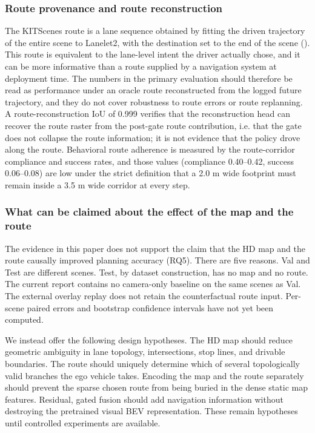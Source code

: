 \documentclass[
  english,
  10pt,
]{article}
\begin{document}
\subsubsection{Route provenance and route
reconstruction}\label{route-provenance-and-route-reconstruction}

The KITScenes route is a lane sequence obtained by fitting the driven
trajectory of the entire scene to Lanelet2, with the destination set to
the end of the scene (\hyperref[fig-route]{}). This route is equivalent
to the lane-level intent the driver actually chose, and it can be more
informative than a route supplied by a navigation system at deployment
time. The numbers in the primary evaluation should therefore be read as
performance under an oracle route reconstructed from the logged future
trajectory, and they do not cover robustness to route errors or route
replanning. A route-reconstruction IoU of 0.999 verifies that the
reconstruction head can recover the route raster from the post-gate
route contribution, i.e. that the gate does not collapse the route
information; it is not evidence that the policy drove along the route.
Behavioral route adherence is measured by the route-corridor compliance
and success rates, and those values (compliance 0.40--0.42, success
0.06--0.08) are low under the strict definition that a 2.0 m wide
footprint must remain inside a 3.5 m wide corridor at every step.

\subsubsection{What can be claimed about the effect of the map and the
route}\label{what-can-be-claimed-about-the-effect-of-the-map-and-the-route}

The evidence in this paper does not support the claim that the HD map
and the route causally improved planning accuracy (RQ5). There are five
reasons. Val and Test are different scenes. Test, by dataset
construction, has no map and no route. The current report contains no
camera-only baseline on the same scenes as Val. The external overlay
replay does not retain the counterfactual route input. Per-scene paired
errors and bootstrap confidence intervals have not yet been computed.

We instead offer the following design hypotheses. The HD map should
reduce geometric ambiguity in lane topology, intersections, stop lines,
and drivable boundaries. The route should uniquely determine which of
several topologically valid branches the ego vehicle takes. Encoding the
map and the route separately should prevent the sparse chosen route from
being buried in the dense static map features. Residual, gated fusion
should add navigation information without destroying the pretrained
visual BEV representation. These remain hypotheses until controlled
experiments are available.
\end{document}
